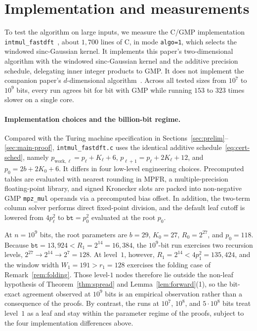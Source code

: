\section{Implementation and measurements}\label{sec:empirical}

To test the algorithm on large inputs, we measure the C/GMP implementation \texttt{intmul\_\allowbreak fastdft}~\cite{CGMP26}, about $1{,}700$ lines of C, in mode \texttt{algo=1}, which selects the windowed sinc-Gaussian kernel. It implements this paper's two-dimensional algorithm with the windowed sinc-Gaussian kernel and the additive precision schedule, delegating inner integer products to GMP. It does not implement the companion paper's $d$-dimensional algorithm~\cite{CLW26}. Across all tested sizes from $10^7$ to $10^9$ bits, every run agrees bit for bit with GMP while running $153$ to $323$ times slower on a single core.

\paragraph{Implementation choices and the billion-bit regime.}
Compared with the Turing machine specification in Sections~\ref{sec:prelim}--\ref{sec:main-proof}, \texttt{intmul\_fastdft.c} uses the identical additive schedule~\eqref{eq:cert-sched}, namely $p_{\mathrm{work},\ell} = p_\ell + K_\ell + 6$, $p_{\ell+1} = p_\ell + 2 K_\ell + 12$, and $p_0 = 2b + 2K_0 + 6$. It differs in four low-level engineering choices. Precomputed tables are evaluated with nearest rounding in MPFR, a multiple-precision floating-point library, and signed Kronecker slots are packed into non-negative GMP \texttt{mpz\_mul} operands via a precomputed bias offset. In addition, the two-term column solver performs direct fixed-point division, and the default leaf cutoff is lowered from $4 p_\ell^2$ to $\texttt{bt} = p_0^2$ evaluated at the root $p_0$.

At $n = 10^9$ bits, the root parameters are $b = 29$, $K_0 = 27$, $R_0 = 2^{27}$, and $p_0 = 118$. Because $\texttt{bt} = 13{,}924 < R_1 = 2^{14} = 16{,}384$, the $10^9$-bit run exercises two recursion levels, $2^{27} \to 2^{14} \to 2^7 = 128$. At level~$1$, however, $R_1 = 2^{14} < 4 p_1^2 = 135{,}424$, and the window width $W_1 = 191 > r_1 = 128$ exercises the folding case of Remark~\ref{rem:folding}. Those level-$1$ nodes therefore lie outside the non-leaf hypothesis of Theorem~\ref{thm:spread} and Lemma~\ref{lem:forward}(1), so the bit-exact agreement observed at $10^9$ bits is an empirical observation rather than a consequence of the proofs. By contrast, the runs at $10^7$, $10^8$, and $5\cdot 10^8$ bits treat level~$1$ as a leaf and stay within the parameter regime of the proofs, subject to the four implementation differences above.

